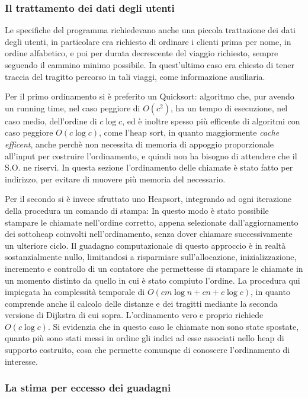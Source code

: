 \documentclass[a4paper,11pt]{Article}
\begin{document}
\subsubsection{Il trattamento dei dati degli utenti}

Le specifiche del programma richiedevano anche una piccola trattazione dei dati degli utenti, in particolare era richiesto di ordinare i clienti prima per nome, in ordine alfabetico, e poi per durata decrescente del viaggio richiesto, sempre seguendo il cammino minimo possibile. In quest'ultimo caso era chiesto di tener traccia del tragitto percorso in tali viaggi, come informazione ausiliaria.

Per il primo ordinamento si è preferito un Quicksort: algoritmo che, pur avendo un running time, nel caso peggiore di $O(c^2)$, ha un tempo di esecuzione, nel caso medio, dell'ordine di $c\log{c}$, ed è inoltre spesso più efficente di algoritmi con caso peggiore $O(c\log{c})$, come l'heap sort, in quanto maggiormente \textit{cache efficent}, anche perchè non necessita di memoria di appoggio proporzionale all'input per costruire l'ordinamento, e quindi non ha bisogno di attendere che il S.O. ne riservi.
In questa sezione l'ordinamento delle chiamate è stato fatto per indirizzo, per evitare di muovere più memoria del necessario.

Per il secondo si è invece sfruttato uno Heapsort, integrando ad ogni iterazione della procedura un comando di stampa: In questo modo è stato possibile stampare le chiamate nell'ordine corretto, appena selezionate dall'aggiornamento dei sottoheap coinvolti nell'ordinamento, senza dover chiamare successivamente un ulteriore ciclo. Il guadagno computazionale di questo approccio è in realtà sostanzialmente nullo, limitandosi a risparmiare sull'allocazione, inizializzazione, incremento e controllo di un contatore che permettesse di stampare le chiamate in un momento distinto da quello in cui è stato compiuto l'ordine. La procedura qui impiegata ha complessità temporale di $O(cm\log{n} + cn + c\log{c})$, in quanto comprende anche il calcolo delle distanze e dei tragitti mediante la seconda versione di Dijkstra di cui sopra. L'ordinamento vero e proprio richiede $O(c\log{c})$.
Si evidenzia che in questo caso le chiamate non sono state spostate, quanto più sono stati messi in ordine gli indici ad esse associati nello heap di supporto costruito, cosa che permette comunque di conoscere l'ordinamento di interesse.

\subsubsection{La stima per eccesso dei guadagni}
\end{document}
